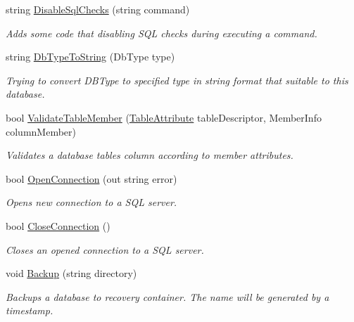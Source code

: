 \begin{DoxyCompactItemize}
string \mbox{\hyperlink{interface_uniform_data_operator_1_1_sql_1_1_i_sql_operator_a0757f304a24ffaa743e23e8bdd210950}{Disable\+Sql\+Checks}} (string command)
\begin{DoxyCompactList}\small\item\em Adds some code that disabling S\+QL checks during executing a command. \end{DoxyCompactList}\item 
string \mbox{\hyperlink{interface_uniform_data_operator_1_1_sql_1_1_i_sql_operator_a51af40df39808d53cdcc81852b836634}{Db\+Type\+To\+String}} (Db\+Type type)
\begin{DoxyCompactList}\small\item\em Trying to convert D\+B\+Type to specified type in string format that suitable to this database. \end{DoxyCompactList}\item 
bool \mbox{\hyperlink{interface_uniform_data_operator_1_1_sql_1_1_i_sql_operator_ac8df6e071646a229acd4781c80d43b68}{Validate\+Table\+Member}} (\mbox{\hyperlink{class_uniform_data_operator_1_1_sql_1_1_markup_1_1_table_attribute}{Table\+Attribute}} table\+Descriptor, Member\+Info column\+Member)
\begin{DoxyCompactList}\small\item\em Validates a database table\textquotesingle{}s column according to member attributes. \end{DoxyCompactList}\item 
bool \mbox{\hyperlink{interface_uniform_data_operator_1_1_sql_1_1_i_sql_operator_a6fc9e5efd1e21ae9998b9c56ae9e347c}{Open\+Connection}} (out string error)
\begin{DoxyCompactList}\small\item\em Opens new connection to a S\+QL server. \end{DoxyCompactList}\item 
bool \mbox{\hyperlink{interface_uniform_data_operator_1_1_sql_1_1_i_sql_operator_a1a6429996e1bbb452f4e034fd634e640}{Close\+Connection}} ()
\begin{DoxyCompactList}\small\item\em Closes an opened connection to a S\+QL server. \end{DoxyCompactList}\item 
void \mbox{\hyperlink{interface_uniform_data_operator_1_1_sql_1_1_i_sql_operator_a096be4f746c1fcbb8b2894c2517b937c}{Backup}} (string directory)
\begin{DoxyCompactList}\small\item\em Backups a database to recovery container. The name will be generated by a timestamp. \end{DoxyCompactList}\item 

\end{DoxyCompactItemize}
